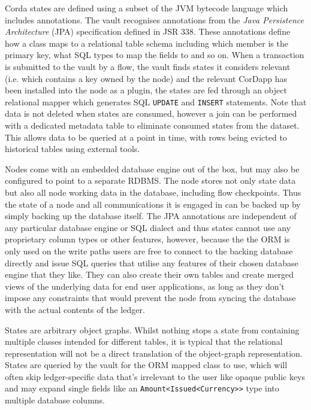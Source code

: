 \documentclass{article}
\begin{document}
Corda states are defined using a subset of the JVM bytecode language which includes annotations. The vault recognises
annotations from the \emph{Java Persistence Architecture} (JPA) specification defined in JSR 338\cite{JPA}.
These annotations define how a class maps to a relational table schema including which member is the primary key, what
SQL types to map the fields to and so on. When a transaction is submitted to the vault by a flow, the vault finds
states it considers relevant (i.e. which contains a key owned by the node) and the relevant CorDapp has been installed
into the node as a plugin, the states are fed through an object relational mapper which generates SQL \texttt{UPDATE}
and \texttt{INSERT} statements. Note that data is not deleted when states are consumed, however a join can be performed
with a dedicated metadata table to eliminate consumed states from the dataset. This allows data to be queried at a point
in time, with rows being evicted to historical tables using external tools.

Nodes come with an embedded database engine out of the box, but may also be configured to point to a separate RDBMS.
The node stores not only state data but also all node working data in the database, including flow checkpoints. Thus
the state of a node and all communications it is engaged in can be backed up by simply backing up the database itself.
The JPA annotations are independent of any particular database engine or SQL dialect and thus states cannot use any
proprietary column types or other features, however, because the the ORM is only used on the write paths users are free
to connect to the backing database directly and issue SQL queries that utilise any features of their chosen database
engine that they like. They can also create their own tables and create merged views of the underlying data for end
user applications, as long as they don't impose any constraints that would prevent the node from syncing the database
with the actual contents of the ledger.


States are arbitrary object graphs. Whilst nothing stops a state from containing multiple classes intended for different
tables, it is typical that the relational representation will not be a direct translation of the object-graph
representation. States are queried by the vault for the ORM mapped class to use, which will often skip ledger-specific
data that's irrelevant to the user like opaque public keys and may expand single fields like an \texttt{Amount<Issued<Currency>>}
type into multiple database columns.
\end{document}
